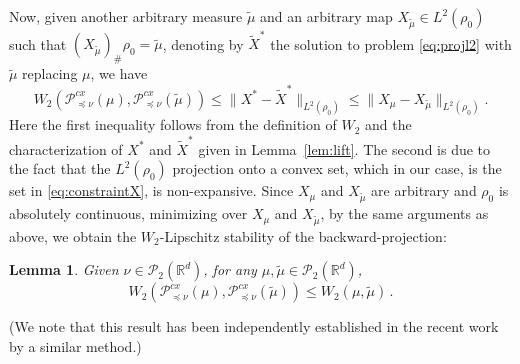 \documentclass[12pt]{amsart}
\def\mc#1{\mathcal{#1}}
\newtheorem{lemma}{Lemma}
\begin{document}
Now, given another arbitrary measure $\tilde{\mu}$ and an arbitrary map $X_{\tilde{\mu}}\in L^2(\rho_0)$ such that $(X_{\tilde \mu})_\# \rho_0= \tilde{\mu}$, denoting by $\tilde{X}^*$ the  solution to problem \eqref{eq:projl2} with $\tilde{\mu}$ replacing $\mu$, we have
\begin{equation}\label{eq:stabproj}
W_2(\mathscr{P}_{\preceq \nu}^{cx} (\mu),\mathscr{P}_{\preceq \nu}^{cx} (\tilde{\mu}))\leq \|X^* - \tilde{X}^*\|_{L^2(\rho_0)} \leq \| X_\mu - X_{\tilde{\mu}}\|_{L^2(\rho_0)}.
\end{equation}
Here the first inequality follows from the definition of $W_2$  and the characterization of $X^*$ and $\tilde X^*$ given in Lemma~\ref{lem:lift}.  The second is due to the fact that the $L^2(\rho_0)$ projection onto a convex set, {which in our case, is the set in \eqref{eq:constraintX},} is non-expansive. Since $X_\mu$ and $X_{\tilde{\mu}}$ are arbitrary and $\rho_0$ is absolutely continuous, minimizing over $X_\mu$ and $X_{\tilde{\mu}}$, by the same arguments as above, we obtain the {$W_2$-Lipschitz stability of the backward-projection}:






\begin{lemma}\label{lem:nonexpansive} Given $\nu \in \mc{P}_2(\mathbb{R}^d)$, for any $\mu, \tilde{\mu}\in\mc{P}_2(\mathbb{R}^d)$,
\[
W_2(\mathscr{P}_{\preceq \nu}^{cx}(\mu),\mathscr{P}_{\preceq \nu}^{cx}(\tilde{\mu}))\leq W_2(\mu,\tilde{\mu})\,.
\]
\end{lemma}
{(We note that this result has been independently established in the recent work \cite[Proposition 2.2]{alfonsi2025wasserstein} by a similar method.)}
\end{document}
